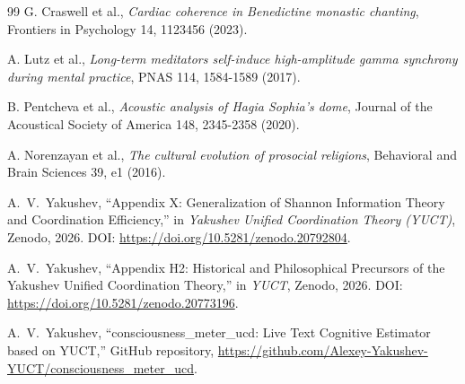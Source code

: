 \documentclass[11pt,a4paper]{article}
\begin{document}
\begin{thebibliography}{99}
		G. Craswell et al., \emph{Cardiac coherence in Benedictine monastic chanting}, Frontiers in Psychology 14, 1123456 (2023).
		
		A. Lutz et al., \emph{Long-term meditators self-induce high-amplitude gamma synchrony during mental practice}, PNAS 114, 1584-1589 (2017).
		
		B. Pentcheva et al., \emph{Acoustic analysis of Hagia Sophia's dome}, Journal of the Acoustical Society of America 148, 2345-2358 (2020).
		
		A. Norenzayan et al., \emph{The cultural evolution of prosocial religions}, Behavioral and Brain Sciences 39, e1 (2016).
		
		A.~V.~Yakushev, ``Appendix X: Generalization of Shannon Information Theory and Coordination Efficiency,'' in \emph{Yakushev Unified Coordination Theory (YUCT)}, Zenodo, 2026. DOI: \url{https://doi.org/10.5281/zenodo.20792804}.
		
		A.~V.~Yakushev, ``Appendix H2: Historical and Philosophical Precursors of the Yakushev Unified Coordination Theory,'' in \emph{YUCT}, Zenodo, 2026. DOI: \url{https://doi.org/10.5281/zenodo.20773196}.
		
		A.~V.~Yakushev, ``consciousness\_meter\_ucd: Live Text Cognitive Estimator based on YUCT,'' GitHub repository, \url{https://github.com/Alexey-Yakushev-YUCT/consciousness_meter_ucd}.
		
	\end{thebibliography}
	
\end{document}
